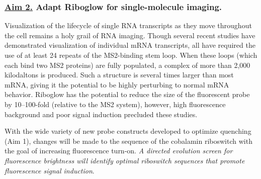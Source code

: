 \subsubsection*{\underline{Aim 2.} Adapt Riboglow for single-molecule imaging.}
Visualization of the lifecycle of single RNA transcripts as they move throughout the cell remains a holy grail of RNA imaging.\cite{LiCentraldogmasinglemolecule2011} Though several recent studies have demonstrated visualization of individual mRNA transcripts, all have required the use of at least 24 repeats of the MS2-binding stem loop\cite{KatzMappingtranslationhotspots2016,FuscoSinglemRNAMolecules2003,YamagishiSinglemoleculeimagingvactin2009,HalsteadRNAbiosensorimaging2015}.
When these loops (which each bind two MS2 proteins) are fully populated, a complex of more than 2,000 kilodaltons is produced.
Such a structure is several times larger than most mRNA, giving it the potential to be highly perturbing to normal mRNA behavior.
Riboglow has the potential to reduce the size of the fluorescent probe by 10--100-fold (relative to the MS2 system), however, high fluorescence background and poor signal induction precluded these studies\cite{BraselmannDevelopmentriboswitchbasedplatform2017}.


With the wide variety of new probe constructs developed to optimize quenching (Aim 1), changes will be made to the sequence of the cobalamin riboswitch with the goal of increasing fluorescence turn-on. \textit{A directed evolution screen for fluorescence brightness will identify optimal riboswitch sequences that promote fluorescence signal induction}.

